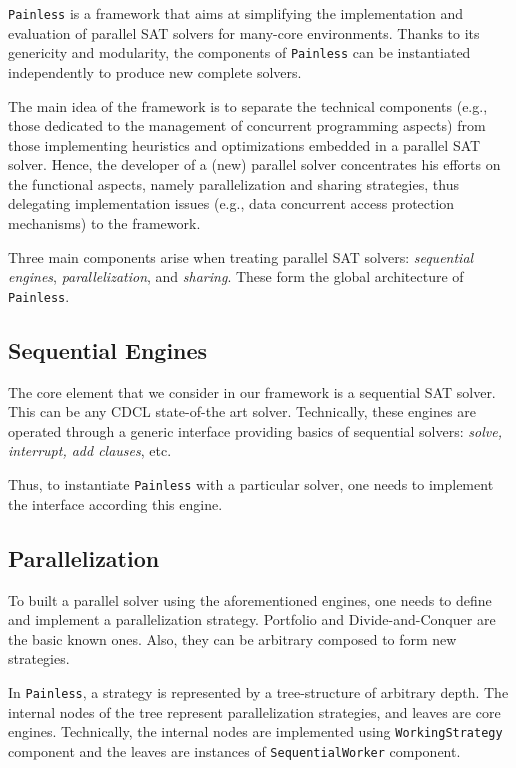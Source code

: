 \documentclass[conference]{IEEEtran}
\newcommand{\painless}[0]{\texttt{Painless}\xspace}
\begin{document}
\painless is a framework that aims at simplifying the implementation and
evaluation of parallel SAT solvers for many-core environments. Thanks to its
genericity and modularity, the components of \painless can be instantiated
independently to produce new complete solvers.

The main idea of the framework is to separate the technical components (e.g.,
those dedicated to the management of concurrent programming aspects) from those
implementing heuristics and optimizations embedded in a parallel SAT solver.
Hence, the developer of a (new) parallel solver concentrates his efforts on the
functional aspects, namely parallelization and sharing strategies, thus
delegating implementation issues (e.g., data concurrent access protection
mechanisms) to the framework.

Three main components arise when treating parallel SAT solvers:
\textit{sequential engines}, \textit{parallelization}, and \textit{sharing}.
These form the global architecture of \painless.

\subsection{Sequential Engines}

The core element that we consider in our framework is a sequential SAT solver.
This can be any CDCL state-of-the art solver. Technically, these engines are
operated through a generic interface providing basics of sequential solvers:
\textit{solve, interrupt, add clauses}, etc.

Thus, to instantiate \painless with a particular solver, one needs to implement
the interface according this engine.  

\subsection{Parallelization}

To built a parallel solver using the aforementioned engines, one needs to
define and implement a parallelization strategy. Portfolio and
Divide-and-Conquer are the basic known ones. Also, they can be arbitrary
composed to form new strategies.

In \painless, a strategy is represented by a tree-structure of arbitrary depth.
The internal nodes of the tree represent parallelization strategies, and leaves
are core engines. Technically, the internal nodes are implemented using
\texttt{WorkingStrategy} component and the leaves are instances of
\texttt{SequentialWorker} component. 
\end{document}

